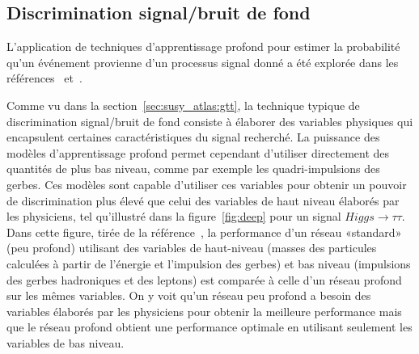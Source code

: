 \subsection{Discrimination signal/bruit de fond}
\label{sec:susy_atlas:dl:evt}

L'application de techniques d'apprentissage profond pour estimer la
probabilité qu'un événement provienne d'un processus signal donné a
été explorée dans les références~\cite{baldi_enhanced_2015} et~\cite{baldi_searching_2014}.

Comme vu dans la section~\ref{sec:susy_atlas:gtt}, la technique typique de discrimination
signal/bruit de fond consiste à élaborer des variables physiques qui
encapsulent certaines caractéristiques du signal recherché. La
puissance des modèles d'apprentissage profond permet cependant
d'utiliser directement des quantités de plus bas niveau, comme par
exemple les quadri-impulsions des gerbes. Ces modèles sont capable d'utiliser
ces variables pour obtenir un pouvoir de discrimination plus élevé que
celui des variables de haut niveau élaborés par les physiciens, tel
qu'illustré dans la figure~\ref{fig:deep} pour un signal
$Higgs \rightarrow\tau\tau$.  Dans cette figure, tirée de la
référence~\cite{baldi_searching_2014}, la performance d'un réseau
«standard» (peu profond) utilisant des variables de haut-niveau
(masses des particules calculées à partir de l'énergie et l'impulsion
des gerbes) et bas niveau (impulsions des gerbes hadroniques et des
leptons) est comparée à celle d'un réseau profond sur les mêmes
variables. On y voit qu'un réseau peu profond a besoin des variables
élaborés par les physiciens pour obtenir la meilleure performance mais
que le réseau profond obtient une performance optimale en
utilisant seulement les variables de bas niveau.

